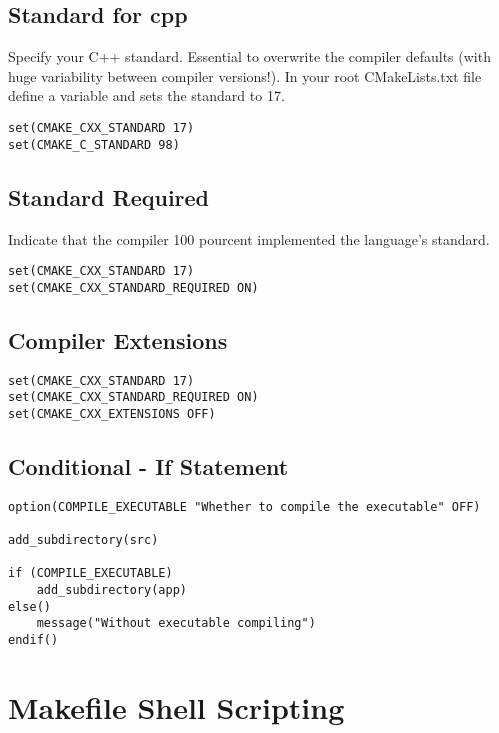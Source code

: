 \documentclass[openany]{report}
\begin{document}
\subsection{Standard for cpp}

Specify your C++ standard. Essential to overwrite the compiler defaults
(with huge variability between compiler versions!).
In your root CMakeLists.txt file define a variable and sets the standard to 17.

\begin{verbatim}
set(CMAKE_CXX_STANDARD 17)
set(CMAKE_C_STANDARD 98)
\end{verbatim}

\subsection{Standard Required}

Indicate that the compiler 100 pourcent implemented the language's standard.

\begin{verbatim}
set(CMAKE_CXX_STANDARD 17)
set(CMAKE_CXX_STANDARD_REQUIRED ON)
\end{verbatim}

\subsection{Compiler Extensions}

\begin{verbatim}
set(CMAKE_CXX_STANDARD 17)
set(CMAKE_CXX_STANDARD_REQUIRED ON)
set(CMAKE_CXX_EXTENSIONS OFF)
\end{verbatim}

\subsection{Conditional - If Statement}

\begin{verbatim}
option(COMPILE_EXECUTABLE "Whether to compile the executable" OFF)

add_subdirectory(src)

if (COMPILE_EXECUTABLE)
    add_subdirectory(app)
else()
    message("Without executable compiling")
endif()
\end{verbatim}


\section{Makefile Shell Scripting}
\end{document}
